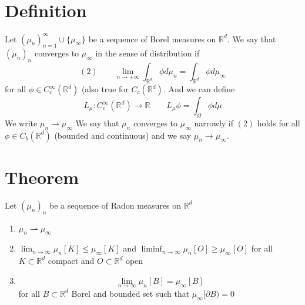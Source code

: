 \documentclass[11pt]{article}
\begin{document}
\section{Definition}
Let $(\mu_n)_{n=1}^{\infty} \cup \{\mu_{\infty}\}$ be a sequence of Borel measures on $ \mathbb{R}^{d}$.
We say that $(\mu_n)_n$ converges to $\mu_{\infty}$ in the sense of distribution if
\[
    (2) \qquad    \lim_{n\to +\infty} \int_{ \mathbb{R}^{d}}^{}\phi d \mu_n = \int_{ \mathbb{R}^{d}}^{}\phi d \mu_{\infty}
\] 
for all $\phi \in C_c^{\infty}( \mathbb{R}^{d})$ (also true for $C_c( \mathbb{R}^{d})$.
And we can define
\[
    L_\mu : C_c^{\infty} ( \mathbb{R}^{d}) \rightarrow \mathbb{R} \qquad L_\mu \phi = \int_{ \Omega}^{} \phi d \mu
\] 
We write $\mu_n \rightharpoonup \mu_{\infty}$
We say that $\mu_n$ converges to $\mu_{\infty}$ narrowly if $(2)$ holds for all   $\phi \in C_b( \mathbb{R}^{d})$ (bounded and continuous) and we say $\mu_n \rightarrow \mu_{\infty}$.

\section{Theorem}
Let $(\mu_n)_n$ be a sequence of Radon measures on $ \mathbb{R}^{d}$
\begin{enumerate}
    \item $\mu_n \rightharpoonup \mu_\infty$
    \item  $\lim_{n\to \infty}\mu_n[K] \le \mu_{\infty}[K]$ and $\liminf_{n\to \infty}\mu_n[O] \ge \mu_{\infty}[O]$ for all $ K \subset \mathbb{R}^{d} $ compact and $O \subset \mathbb{R}^{d}$ open
    \item \[
            \lim_{n\to \infty} \mu_n[B] = \mu_{\infty}[B]
    \] 
    for all $B \subset \mathbb{R}^{d}$ Borel and bounded set such that $\mu_{\infty}[ \partial B) = 0$
\end{enumerate}
\end{document}
